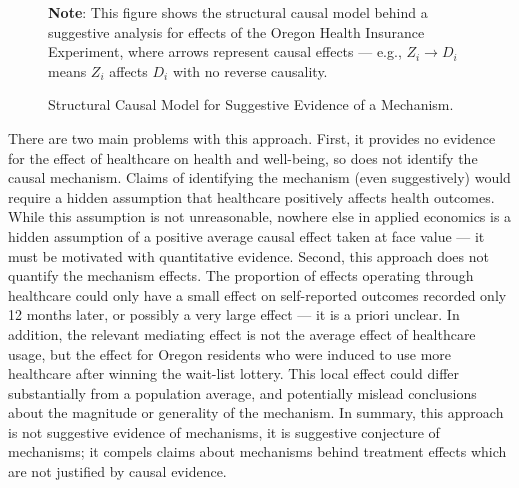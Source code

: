 \begin{figure}[!h]
    \centering
    \singlespacing
    \caption{Structural Causal Model for Suggestive Evidence of a Mechanism.}
    \label{fig:scm-health}
    \justify
    \footnotesize
    \textbf{Note}:
    This figure shows the structural causal model behind a suggestive analysis for effects of the Oregon Health Insurance Experiment, where arrows represent causal effects --- e.g., $Z_i \to D_i$ means $Z_i$ affects $D_i$ with no reverse causality.
\end{figure}

There are two main problems with this approach.
First, it provides no evidence for the effect of healthcare on health and well-being, so does not identify the causal mechanism.
Claims of identifying the mechanism (even suggestively) would require a hidden assumption that healthcare positively affects health outcomes.
While this assumption is not unreasonable, nowhere else in applied economics is a hidden assumption of a positive average causal effect taken at face value --- it must be motivated with quantitative evidence.
Second, this approach does not quantify the mechanism effects.
The proportion of effects operating through healthcare could only have a small effect on self-reported outcomes recorded only 12 months later, or possibly a very large effect --- it is a priori unclear.
In addition, the relevant mediating effect is not the average effect of healthcare usage, but the effect for Oregon residents who were induced to use more healthcare after winning the wait-list lottery. 
This local effect could differ substantially from a population average, and potentially mislead conclusions about the magnitude or generality of the mechanism.
In summary, this approach is not suggestive evidence of mechanisms, it is suggestive conjecture of mechanisms; it compels claims about mechanisms behind treatment effects which are not justified by causal evidence.

